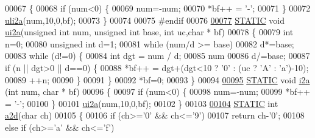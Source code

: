 \begin{DoxyCode}
00067     \{
00068     \textcolor{keywordflow}{if} (num<0) \{
00069         num=-num;
00070         *bf++ = \textcolor{charliteral}{'-'};
00071         \}
00072     \hyperlink{a00043_ac8448f6a2ace7b25fc6fbd5561fe5e75}{uli2a}(num,10,0,bf);
00073     \}
00074 
00075 \textcolor{preprocessor}{#endif}
00076 
\hypertarget{a00043_source_l00077}{}\hyperlink{a00043_ae17e69308453bdacaa3b6475d441aa7b}{00077} \hyperlink{a00043_a10b2d890d871e1489bb02b7e70d9bdfb}{STATIC} \textcolor{keywordtype}{void} \hyperlink{a00043_ae17e69308453bdacaa3b6475d441aa7b}{ui2a}(\textcolor{keywordtype}{unsigned} \textcolor{keywordtype}{int} num, \textcolor{keywordtype}{unsigned} \textcolor{keywordtype}{int} base, \textcolor{keywordtype}{int} uc,\textcolor{keywordtype}{char} * bf)
00078     \{
00079     \textcolor{keywordtype}{int} n=0;
00080     \textcolor{keywordtype}{unsigned} \textcolor{keywordtype}{int} d=1;
00081     \textcolor{keywordflow}{while} (num/d >= base)
00082         d*=base;        
00083     \textcolor{keywordflow}{while} (d!=0) \{
00084         \textcolor{keywordtype}{int} dgt = num / d;
00085         num%
00086         d/=base;
00087         \textcolor{keywordflow}{if} (n || dgt>0 || d==0) \{
00088             *bf++ = dgt+(dgt<10 ? \textcolor{charliteral}{'0'} : (uc ? \textcolor{charliteral}{'A'} : \textcolor{charliteral}{'a'})-10);
00089             ++n;
00090             \}
00091         \}
00092     *bf=0;
00093     \}
00094 
\hypertarget{a00043_source_l00095}{}\hyperlink{a00043_a13e43d9a7f9f5fedcc3889ed0dfe1cad}{00095} \hyperlink{a00043_a10b2d890d871e1489bb02b7e70d9bdfb}{STATIC} \textcolor{keywordtype}{void} \hyperlink{a00043_a13e43d9a7f9f5fedcc3889ed0dfe1cad}{i2a} (\textcolor{keywordtype}{int} num, \textcolor{keywordtype}{char} * bf)
00096     \{
00097     \textcolor{keywordflow}{if} (num<0) \{
00098         num=-num;
00099         *bf++ = \textcolor{charliteral}{'-'};
00100         \}
00101     \hyperlink{a00043_ae17e69308453bdacaa3b6475d441aa7b}{ui2a}(num,10,0,bf);
00102     \}
00103 
\hypertarget{a00043_source_l00104}{}\hyperlink{a00043_a0f3bca7da68487662b7dff4aa60e2079}{00104} \hyperlink{a00043_a10b2d890d871e1489bb02b7e70d9bdfb}{STATIC} \textcolor{keywordtype}{int} \hyperlink{a00043_a0f3bca7da68487662b7dff4aa60e2079}{a2d}(\textcolor{keywordtype}{char} ch)
00105     \{
00106     \textcolor{keywordflow}{if} (ch>=\textcolor{charliteral}{'0'} && ch<=\textcolor{charliteral}{'9'}) 
00107         \textcolor{keywordflow}{return} ch-\textcolor{charliteral}{'0'};
00108     \textcolor{keywordflow}{else} \textcolor{keywordflow}{if} (ch>=\textcolor{charliteral}{'a'} && ch<=\textcolor{charliteral}{'f'})

\end{DoxyCode}
